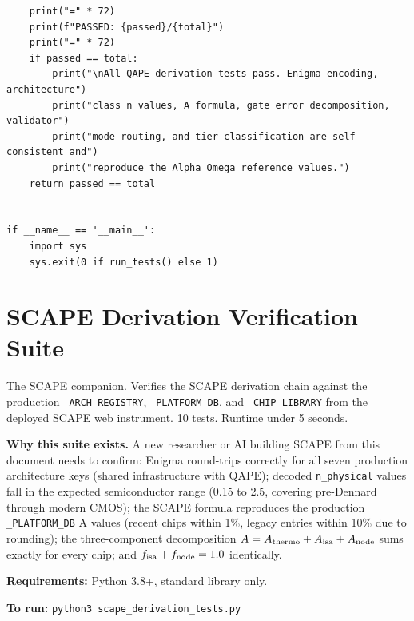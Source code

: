 \documentclass[12pt,a4paper]{article}
\begin{document}
\begin{verbatim}
    print("=" * 72)
    print(f"PASSED: {passed}/{total}")
    print("=" * 72)
    if passed == total:
        print("\nAll QAPE derivation tests pass. Enigma encoding, architecture")
        print("class n values, A formula, gate error decomposition, validator")
        print("mode routing, and tier classification are self-consistent and")
        print("reproduce the Alpha Omega reference values.")
    return passed == total


if __name__ == '__main__':
    import sys
    sys.exit(0 if run_tests() else 1)
\end{verbatim}

\newpage
\section{SCAPE Derivation Verification Suite}
\label{app:scape_tests}

The SCAPE companion. Verifies the SCAPE derivation chain against the
production \texttt{\_ARCH\_REGISTRY}, \texttt{\_PLATFORM\_DB}, and
\texttt{\_CHIP\_LIBRARY} from the deployed SCAPE web instrument.
10 tests. Runtime under 5 seconds.

\textbf{Why this suite exists.} A new researcher or AI building SCAPE from
this document needs to confirm: Enigma round-trips correctly for all seven
production architecture keys (shared infrastructure with QAPE); decoded
\texttt{n\_physical} values fall in the expected semiconductor range
(0.15 to 2.5, covering pre-Dennard through modern CMOS); the SCAPE formula
reproduces the production \texttt{\_PLATFORM\_DB} A values (recent chips
within 1\%, legacy entries within 10\% due to rounding); the three-component
decomposition $A = A_{\rm thermo} + A_{\rm isa} + A_{\rm node}$ sums exactly
for every chip; and $f_{\rm isa} + f_{\rm node} = 1.0$ identically.

\textbf{Requirements:} Python 3.8+, standard library only.

\textbf{To run:} \texttt{python3 scape\_derivation\_tests.py}
\end{document}
